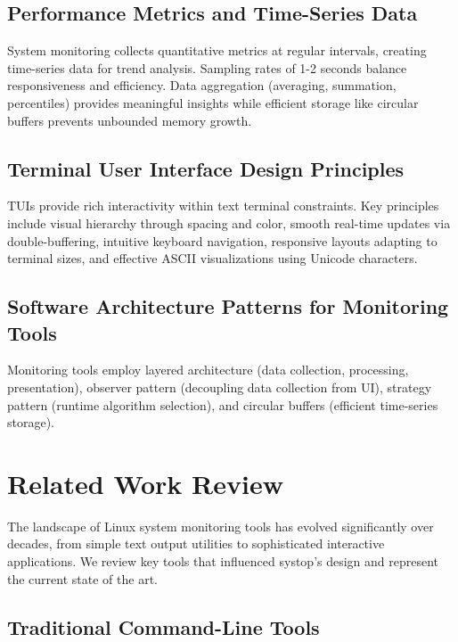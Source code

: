 \documentclass[12pt,a4paper,oneside]{report}
\begin{document}
\subsection{Performance Metrics and Time-Series Data}

System monitoring collects quantitative metrics at regular intervals, creating time-series data for trend analysis. Sampling rates of 1-2 seconds balance responsiveness and efficiency. Data aggregation (averaging, summation, percentiles) provides meaningful insights while efficient storage like circular buffers prevents unbounded memory growth.

\subsection{Terminal User Interface Design Principles}

TUIs provide rich interactivity within text terminal constraints. Key principles include visual hierarchy through spacing and color, smooth real-time updates via double-buffering, intuitive keyboard navigation, responsive layouts adapting to terminal sizes, and effective ASCII visualizations using Unicode characters.

\subsection{Software Architecture Patterns for Monitoring Tools}

Monitoring tools employ layered architecture (data collection, processing, presentation), observer pattern (decoupling data collection from UI), strategy pattern (runtime algorithm selection), and circular buffers (efficient time-series storage).

\section{Related Work Review}
\label{sec:related-work}

The landscape of Linux system monitoring tools has evolved significantly over decades, from simple text output utilities to sophisticated interactive applications. We review key tools that influenced systop's design and represent the current state of the art.

\subsection{Traditional Command-Line Tools}
\end{document}
